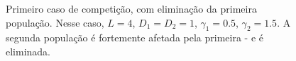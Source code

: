 \documentclass{article}
\begin{document}
	\begin{figure}[h]
		\centering
		\qquad
		\caption{Primeiro caso de competição, com eliminação da primeira população. Nesse caso, $L = 4$, $D_1 = D_2 = 1$,  $\gamma_1 = 0.5$, $\gamma_2 = 1.5$. A segunda população é fortemente afetada pela primeira - e é eliminada.}
		\label{fig:Two-P-04-Competition-Time}
	\end{figure}	
	
\end{document}
